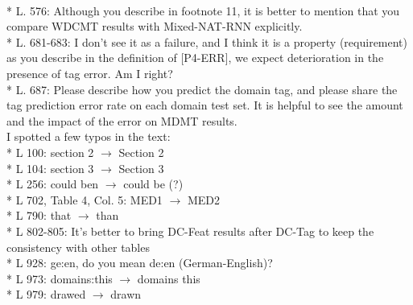 \documentclass[12pt,times,a4paper,twoside]{article}
\theoremstyle{definition}
\begin{document}
\\
* L. 576: Although you describe in footnote 11, it is better to mention that you compare WDCMT results with Mixed-NAT-RNN explicitly.
\\
* L. 681-683: I don’t see it as a failure, and I think it is a property (requirement) as you describe in the definition of [P4-ERR], we expect deterioration in the presence of tag error. Am I right?
\\
* L. 687: Please describe how you predict the domain tag, and please share the tag prediction error rate on each domain test set. It is helpful to see the amount and the impact of the error on MDMT results.
\\
I spotted a few typos in the text:
\\
* L 100: section 2 $\rightarrow$ Section 2
\\
* L 104: section 3 $\rightarrow$ Section 3
\\
* L 256: could ben $\rightarrow$ could be (?)
\\
* L 702, Table 4, Col. 5: MED1 $\rightarrow$ MED2
\\
* L 790: that $\rightarrow$ than
\\
* L 802-805: It’s better to bring DC-Feat results after DC-Tag to keep the consistency with other tables 
\\
* L 928: ge:en, do you mean de:en (German-English)? 
\\
* L 973: domains:this $\rightarrow$ domains this
\\
* L 979: drawed $\rightarrow$ drawn 
\end{document}

